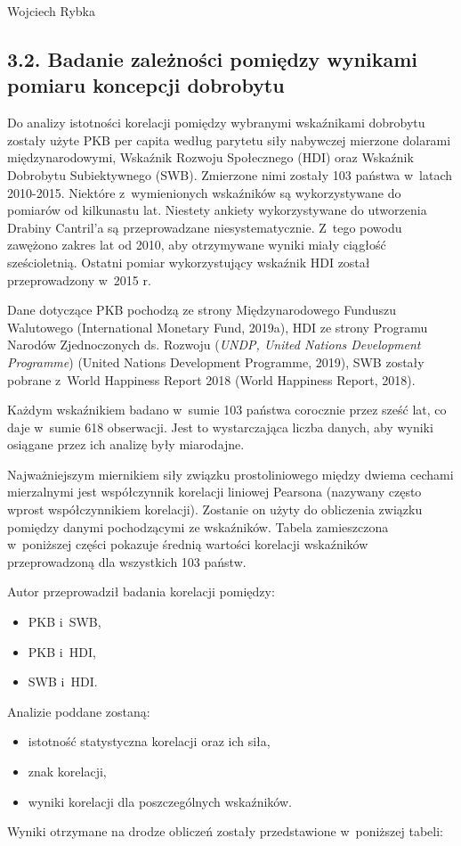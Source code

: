 \begin{artplenv}{Wojciech Rybka}
\subsection{3.2. Badanie zależności pomiędzy wynikami pomiaru koncepcji dobrobytu}
Do analizy istotności korelacji pomiędzy wybranymi wskaźnikami dobrobytu zostały użyte PKB per capita według parytetu
siły nabywczej mierzone dolarami międzynarodowymi, Wskaźnik Rozwoju Społecznego (HDI) oraz Wskaźnik Dobrobytu
Subiektywnego (SWB). Zmierzone nimi zostały 103 państwa w~latach 2010-2015. Niektóre z~wymienionych wskaźników są
wykorzystywane do pomiarów od kilkunastu lat. Niestety ankiety wykorzystywane do utworzenia Drabiny Cantril’a są
przeprowadzane niesystematycznie. Z~tego powodu zawężono zakres lat od 2010, aby otrzymywane wyniki miały ciągłość
sześcioletnią. Ostatni pomiar wykorzystujący wskaźnik HDI został przeprowadzony w~2015 r. 

Dane dotyczące PKB pochodzą ze strony Międzynarodowego Funduszu Walutowego \label{ref:RNDn330vqwTqS}(International
Monetary Fund, 2019a), HDI ze strony Programu Narodów Zjednoczonych ds. Rozwoju (\textit{UNDP, United Nations
Development Programme}) \label{ref:RNDk7s4Od9KIV}(United Nations Development Programme, 2019), SWB zostały
pobrane z~World Happiness Report 2018 \label{ref:RNDierZbEemuV}(World Happiness Report, 2018).

Każdym wskaźnikiem badano w~sumie 103 państwa corocznie przez sześć lat, co daje w~sumie 618 obserwacji. Jest to
wystarczająca liczba danych, aby wyniki osiągane przez ich analizę były miarodajne. 

Najważniejszym miernikiem siły związku prostoliniowego między dwiema cechami mierzalnymi jest współczynnik korelacji
liniowej Pearsona (nazywany często wprost współczynnikiem korelacji). Zostanie on użyty do obliczenia związku pomiędzy
danymi pochodzącymi ze wskaźników. Tabela zamieszczona w~poniższej części pokazuje średnią wartości korelacji
wskaźników przeprowadzoną dla wszystkich 103 państw.

Autor przeprowadził badania korelacji pomiędzy:

\begin{itemize}
\item PKB i~SWB,
\item PKB i~HDI,
\item SWB i~HDI.
\end{itemize}
Analizie poddane zostaną:

\begin{itemize}
\item istotność statystyczna korelacji oraz ich siła,
\item znak korelacji,
\item wyniki korelacji dla poszczególnych wskaźników.
\end{itemize}
Wyniki otrzymane na drodze obliczeń zostały przedstawione w~poniższej tabeli:



\end{artplenv}
